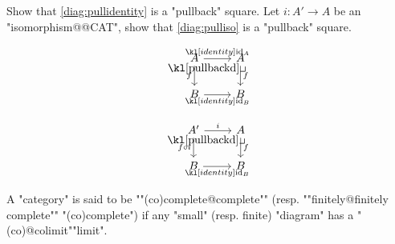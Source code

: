 \documentclass[main.tex]{subfiles}
\begin{document}
\begin{exer}\label{exer:limits:isopullback}
    Show that \eqref{diag:pullidentity} is a "pullback" square. Let $i: A' \rightarrow A$ be an "isomorphism@@CAT", show that \eqref{diag:pulliso} is a "pullback" square.\\
    \begin{minipage}{0.49\textwidth}
        \begin{equation}\label{diag:pullidentity}
            \begin{tikzcd}
                A & A \\
                B & B
                \arrow["f"', from=1-1, to=2-1]
                \arrow["{\id_A}", from=1-1, to=1-2]
                \arrow["f", from=1-2, to=2-2]
                \arrow["{\id_B}"', from=2-1, to=2-2]
                \arrow["\pullbackd"{anchor=center, pos=0.125}, draw=none, from=1-1, to=2-2]
            \end{tikzcd}
        \end{equation}
    \end{minipage}\begin{minipage}{0.49\textwidth}
        \begin{equation}\label{diag:pulliso}
            \begin{tikzcd}
                A' & A \\
                B & B
                \arrow["f \circ i"', from=1-1, to=2-1]
                \arrow["{i}", from=1-1, to=1-2]
                \arrow["f", from=1-2, to=2-2]
                \arrow["{\id_B}"', from=2-1, to=2-2]
                \arrow["\pullbackd"{anchor=center, pos=0.125}, draw=none, from=1-1, to=2-2]
            \end{tikzcd}
        \end{equation}
    \end{minipage}
\end{exer}

\begin{defn}[(Co)completeness]
    \AP A "category" is said to be ""(co)complete@complete"" (resp. ""finitely@finitely complete"" "(co)complete") if any "small" (resp. finite) "diagram" has a "(co)@colimit""limit".
\end{defn}
\end{document}
